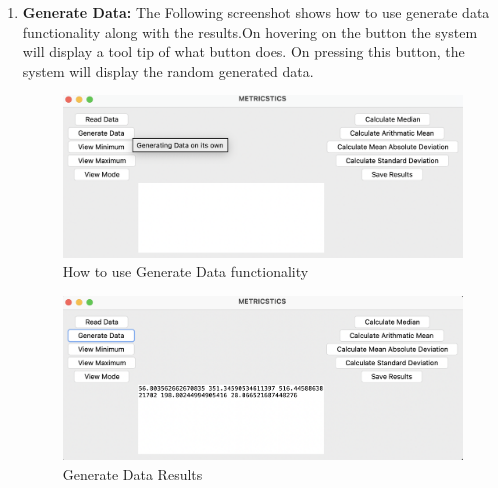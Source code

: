\documentclass{article}
\begin{document}
\begin{enumerate}
    \item \textbf{Generate Data:} The Following screenshot shows how to use generate data functionality along with the results.On hovering on the button the system will display a tool tip of what button does. On pressing this button, the system will display the random generated data.
    \begin{figure}[h]
        \centering
        \includegraphics[width=0.9\linewidth]{GenerateData.png}
        \caption{How to use Generate Data functionality}
    \end{figure}
    \vspace{20em}
    \begin{figure}[h]
        \centering
        \includegraphics[width=0.9\linewidth]{GenerateDataResults.png}
        \caption{Generate Data Results}
    \end{figure}


\end{enumerate}
\end{document}
